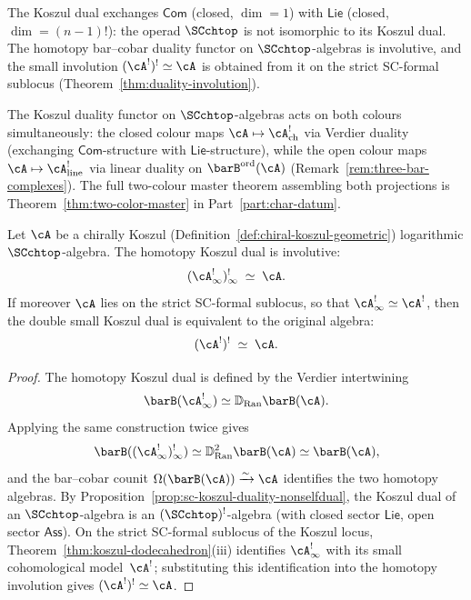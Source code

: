 \begin{remark}
\label{rem:SC-duality-functor-vs-operad}
The Koszul dual exchanges $\mathsf{Com}$ (closed, $\dim = 1$) with
$\mathsf{Lie}$ (closed, $\dim = (n-1)!$): the operad $\SCchtop$ is
not isomorphic to its Koszul dual. The homotopy bar--cobar duality
functor on $\SCchtop$-algebras is involutive, and the small
involution $(\cA^!)^! \simeq \cA$ is obtained from it on the strict
SC-formal sublocus (Theorem~\ref{thm:duality-involution}).
\end{remark}

The Koszul duality functor on $\SCchtop$-algebras acts on both colours
simultaneously: the closed colour maps
$\cA \mapsto \cA^!_{\mathrm{ch}}$ via Verdier duality
(exchanging $\mathsf{Com}$-structure with $\mathsf{Lie}$-structure),
while the open colour maps
$\cA \mapsto \cA^!_{\mathrm{line}}$ via linear duality on
$\barB^{\mathrm{ord}}(\cA)$
(Remark~\ref{rem:three-bar-complexes}). The full two-colour
master theorem assembling both projections is
Theorem~\ref{thm:two-color-master} in Part~\ref{part:char-datum}\@.

\begin{theorem}
\label{thm:duality-involution}
Let\/ $\cA$ be a chirally Koszul
\textup{(}Definition~\textup{\ref{def:chiral-koszul-geometric})}
logarithmic $\SCchtop$-algebra. The homotopy Koszul dual is
involutive:
\[
(\cA^!_\infty)^!_\infty \;\simeq\; \cA .
\]
If moreover\/ $\cA$ lies on the strict SC-formal sublocus, so that
$\cA^!_\infty\simeq \cA^!$, then the double small Koszul dual is
equivalent to the original algebra:
\[
(\cA^!)^! \;\simeq\; \cA.
\]
\end{theorem}

\begin{proof}
The homotopy Koszul dual is defined by the Verdier intertwining
\[
\barB(\cA^!_\infty)\simeq
\mathbb D_{\operatorname{Ran}}\barB(\cA).
\]
Applying the same construction twice gives
\[
\barB((\cA^!_\infty)^!_\infty)
\simeq
\mathbb D_{\operatorname{Ran}}^2\barB(\cA)
\simeq
\barB(\cA),
\]
and the bar--cobar counit
$\Omega(\barB(\cA))\xrightarrow{\sim}\cA$ identifies the two
homotopy algebras. By
Proposition~\ref{prop:sc-koszul-duality-nonselfdual}, the Koszul dual of an
$\SCchtop$-algebra is an $(\SCchtop)^!$-algebra
(with closed sector $\mathsf{Lie}$, open sector $\mathsf{Ass}$).
On the strict SC-formal sublocus of the Koszul locus,
Theorem~\ref{thm:koszul-dodecahedron}(iii) identifies
$\cA^!_\infty$ with its small cohomological model~$\cA^!$; substituting
this identification into the homotopy involution gives
$(\cA^!)^!\simeq\cA$.
\end{proof}

